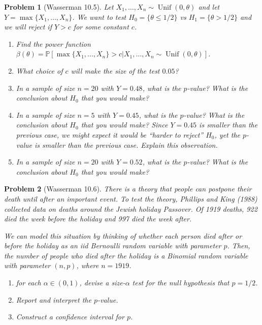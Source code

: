 \documentclass{article}
\newtheorem{problem}{Problem}
\newcommand{\PP}{\mathbb{P}}
\begin{document}
\begin{problem}[Wasserman 10.5]
    Let $X_1, \ldots, X_n\sim \operatorname{Unif}(0,\theta)$ and let $Y=\max\{X_1, \ldots, X_n\}$.
    We want to test $H_0 = \{ \theta  \leq 1/2 \}$ vs $H_1 = \{\theta>1/2\}$ and we will reject if $Y>c$ for some constant $c$.
    \begin{enumerate}[label=(\alph*),topsep=0pt]
        \item Find the power function $\beta(\theta) = \PP[\max\{X_1, \ldots, X_n\} > c | X_1, \ldots, X_n \sim \operatorname{Unif}(0,\theta) ]$.
        \item What choice of $c$ will make the size of the test $0.05$?
        \item In a sample of size $n=20$ with $Y=0.48$, what is the $p$-value? What is the conclusion about $H_0$ that you would make?
        \item In a sample of size $n=5$ with $Y=0.45$, what is the $p$-value? What is the conclusion about $H_0$ that you would make? Since $Y=0.45$ is smaller than the previous case, we might expect it would be ``harder to reject'' $H_0$, yet the $p$-value is smaller than the previous case. 
            Explain this observation. 
        \item In a sample of size $n=20$ with $Y=0.52$, what is the $p$-value? What is the conclusion about $H_0$ that you would make?
    \end{enumerate}

\end{problem}


\begin{problem}[Wasserman 10.6]
There is a theory that people can postpone their death until after an  important event. To test the theory, Phillips and King (1988) collected  data on deaths around the Jewish holiday Passover. 
Of 1919 deaths, 922  died the week before the holiday and 997 died the week after. 

    We can model this situation by thinking of whether each person died after or before the holiday as an iid Bernoulli random variable with parameter $p$.
    Then, the number of people who died after the holiday is a Binomial random variable with parameter $(n,p)$, where $n=1919$.

    \begin{enumerate}[label=(\alph*),topsep=0pt]
        \item for each $\alpha\in(0,1)$, devise a size-$\alpha$ test for the null hypothesis that $p = 1/2$. 
        \item Report and  interpret the $p$-value. 
        \item Construct a confidence interval for $p$.
    \end{enumerate}
\end{problem}
\end{document}
